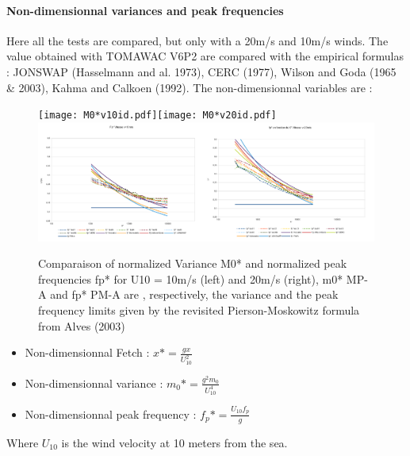 \paragraph{Non-dimensionnal variances and peak frequencies}
Here all the tests are compared, but only with a 20m/s and 10m/s winds. The value obtained with TOMAWAC V6P2 are compared with the empirical formulas : JONSWAP (Hasselmann and al. 1973), CERC (1977), Wilson and Goda (1965 \& 2003), Kahma and Calkoen (1992). The non-dimensionnal variables are :\\
\begin{figure}[H]
  \centering
  	\texttt{[image: M0*v10id.pdf]}\texttt{[image: M0*v20id.pdf]}\\
  	\includegraphics[width=0.5\textwidth]{fp*v10id.pdf}\includegraphics[width=0.5\textwidth]{fp*v20id.pdf}\\
      \caption{Comparaison of normalized Variance M0* and normalized peak frequencies fp* for U10 = 10m/s (left) and 20m/s (right), m0* MP-A and fp* PM-A are , respectively, the variance and the peak frequency limits given by the revisited Pierson-Moskowitz formula from Alves (2003)}
\end{figure}
\begin{itemize}
\item Non-dimensionnal Fetch : $x* = \frac{g x}{U_{10}^2}$
\item Non-dimensionnal variance : $m_{0}* = \frac{g^2 m_{0}}{U_{10}^4}$
\item Non-dimensionnal peak frequency : $f_{p}* = \frac{U_{10} f_{p}}{g}$
\end{itemize}
Where $U_{10}$ is the wind velocity at 10 meters from the sea.\\

